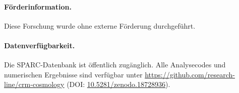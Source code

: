 \documentclass[aps,prd,twocolumn,superscriptaddress,nofootinbib]{revtex4-2}
\begin{document}
\paragraph{F\"orderinformation.}
Diese Forschung wurde ohne externe F\"orderung durchgef\"uhrt.

\paragraph{Datenverf\"ugbarkeit.}
Die SPARC-Datenbank \cite{Lelli2016} ist \"offentlich zug\"anglich.
Alle Analysecodes und numerischen Ergebnisse sind verf\"ugbar unter
\url{https://github.com/research-line/crm-cosmology}
(DOI: \href{https://doi.org/10.5281/zenodo.18728936}{10.5281/zenodo.18728936}).

\end{document}
